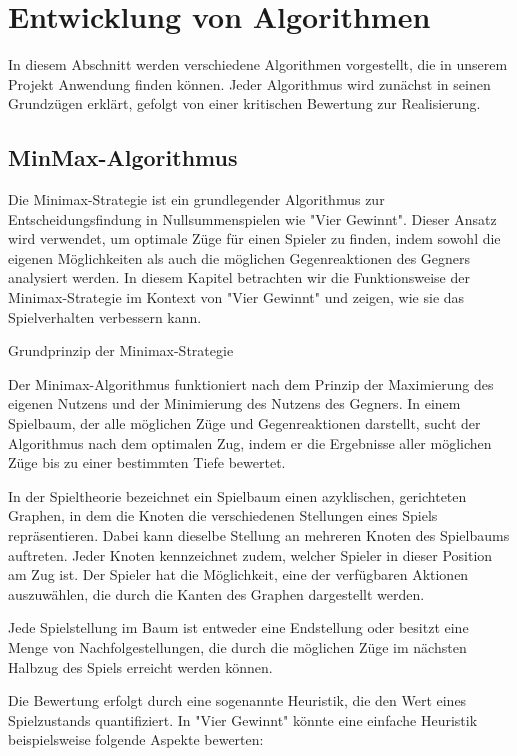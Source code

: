 	
\section{Entwicklung von Algorithmen}
In diesem Abschnitt werden verschiedene Algorithmen vorgestellt, die in unserem Projekt Anwendung finden können. Jeder Algorithmus wird zunächst in seinen Grundzügen erklärt, gefolgt von einer kritischen Bewertung zur Realisierung.
	
\subsection{MinMax-Algorithmus}

Die Minimax-Strategie ist ein grundlegender Algorithmus zur Entscheidungsfindung in Nullsummenspielen wie "Vier Gewinnt". Dieser Ansatz wird verwendet, um optimale Züge für einen Spieler zu finden, indem sowohl die eigenen Möglichkeiten als auch die möglichen Gegenreaktionen des Gegners analysiert werden. In diesem Kapitel betrachten wir die Funktionsweise der Minimax-Strategie im Kontext von "Vier Gewinnt" und zeigen, wie sie das Spielverhalten verbessern kann.

Grundprinzip der Minimax-Strategie

Der Minimax-Algorithmus funktioniert nach dem Prinzip der Maximierung des eigenen Nutzens und der Minimierung des Nutzens des Gegners. In einem Spielbaum, der alle möglichen Züge und Gegenreaktionen darstellt, sucht der Algorithmus nach dem optimalen Zug, indem er die Ergebnisse aller möglichen Züge bis zu einer bestimmten Tiefe bewertet.

In der Spieltheorie bezeichnet ein Spielbaum einen azyklischen, gerichteten Graphen, in dem die Knoten die verschiedenen Stellungen eines Spiels repräsentieren. Dabei kann dieselbe Stellung an mehreren Knoten des Spielbaums auftreten. Jeder Knoten kennzeichnet zudem, welcher Spieler in dieser Position am Zug ist. Der Spieler hat die Möglichkeit, eine der verfügbaren Aktionen auszuwählen, die durch die Kanten des Graphen dargestellt werden.

Jede Spielstellung im Baum ist entweder eine Endstellung oder besitzt eine Menge von Nachfolgestellungen, die durch die möglichen Züge im nächsten Halbzug des Spiels erreicht werden können.

Die Bewertung erfolgt durch eine sogenannte Heuristik, die den Wert eines Spielzustands quantifiziert. In "Vier Gewinnt" könnte eine einfache Heuristik beispielsweise folgende Aspekte bewerten:

